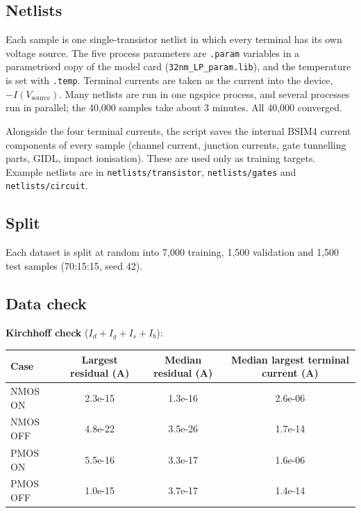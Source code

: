 \documentclass[10pt]{article}
\begin{document}
\subsection*{Netlists}

Each sample is one single-transistor netlist in which every terminal has its own voltage source.
The five process parameters are \texttt{.param} variables in a parametrised copy of the model card
(\texttt{32nm\_LP\_param.lib}), and the temperature is set with \texttt{.temp}. Terminal currents
are taken as the current into the device, $-I(V_\text{source})$. Many netlists are run in one
ngspice process, and several processes run in parallel; the 40,000 samples take about 3 minutes.
All 40,000 converged.

Alongside the four terminal currents, the script saves the internal BSIM4 current components of
every sample (channel current, junction currents, gate tunnelling parts, GIDL, impact ionisation).
These are used only as training targets. Example netlists are in \texttt{netlists/transistor},
\texttt{netlists/gates} and \texttt{netlists/circuit}.

\subsection*{Split}

Each dataset is split at random into 7,000 training, 1,500 validation and 1,500 test samples
(70:15:15, seed 42).

\subsection*{Data check}

\textbf{Kirchhoff check} ($I_d + I_g + I_s + I_b$):

\begin{table}[H]
\centering
\begin{tabular}{@{}lccc@{}}
\toprule
Case & Largest residual (A) & Median residual (A) & Median largest terminal current (A) \\
\midrule
NMOS ON  & 2.3e-15 & 1.3e-16 & 2.6e-06 \\
NMOS OFF & 4.8e-22 & 3.5e-26 & 1.7e-14 \\
PMOS ON  & 5.5e-16 & 3.3e-17 & 1.6e-06 \\
PMOS OFF & 1.0e-15 & 3.7e-17 & 1.4e-14 \\
\bottomrule
\end{tabular}
\end{table}
\end{document}
